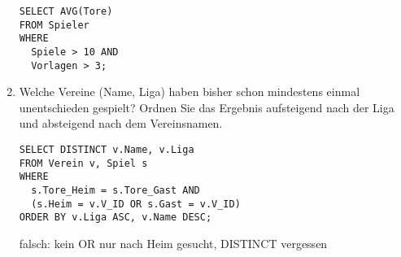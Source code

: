 \documentclass{bschlangaul-aufgabe}
\begin{document}
\begin{enumerate}
\begin{verbatim}
SELECT AVG(Tore)
FROM Spieler
WHERE
  Spiele > 10 AND
  Vorlagen > 3;
\end{verbatim}

%

\item Welche Vereine (Name, Liga) haben bisher schon mindestens einmal
unentschieden gespielt? Ordnen Sie das Ergebnis aufsteigend nach der
Liga und absteigend nach dem Vereinsnamen.

\begin{verbatim}
SELECT DISTINCT v.Name, v.Liga
FROM Verein v, Spiel s
WHERE
  s.Tore_Heim = s.Tore_Gast AND
  (s.Heim = v.V_ID OR s.Gast = v.V_ID)
ORDER BY v.Liga ASC, v.Name DESC;
\end{verbatim}

falsch: kein OR nur nach Heim gesucht, DISTINCT vergessen
\end{enumerate}
\end{document}
